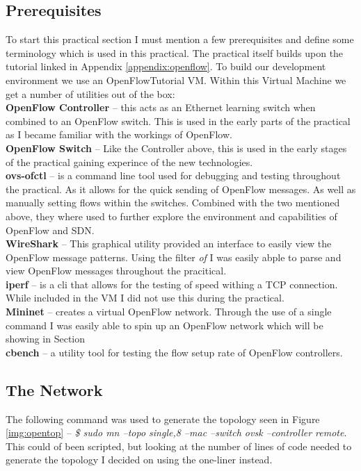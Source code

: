 \subsection{Prerequisites} 
To start this practical section I must mention a few prerequisites and define some terminology which is used in this practical. The practical itself builds upon the tutorial linked in Appendix \ref{appendix:openflow}. To build our development environment we use an OpenFlowTutorial VM. Within this Virtual Machine we get a number of utilities out of the box:
\\\textbf{OpenFlow Controller} -- this acts as an Ethernet learning switch when combined to an OpenFlow switch. This is used in the early parts of the practical as I became familiar with the workings of OpenFlow.
\\\textbf{OpenFlow Switch} -- Like the Controller above, this is used in the early stages of the practical gaining experince of the new technologies.
\\\textbf{ovs-ofctl} -- is a command line tool used for debugging and testing throughout the practical. As it allows for the quick sending of OpenFlow messages. As well as manually setting flows within the switches. Combined with the two mentioned above, they where used to further explore the environment and capabilities of OpenFlow and SDN.
\\\textbf{WireShark} -- This graphical utility provided an interface to easily view the OpenFlow message patterns. Using the filter \textit{of} I was easily abple to parse and view OpenFlow messages throughout the pracitical.
\\\textbf{iperf} -- is a cli that allows for the testing of speed withing a TCP connection. While included in the VM I did not use this during the practical.
\\\textbf{Mininet} -- creates a virtual OpenFlow network. Through the use of a single command I was easily able to spin up an OpenFlow network which will be showing in Section \label{sub:net}
\\\textbf{cbench} -- a utility tool for testing the flow setup rate of OpenFlow controllers.



\clearpage

\subsection{The Network}
\label{sub:net}
The following command was used to generate the topology seen in Figure \ref{img:opentop} -- \textit{\$ sudo mn --topo single,8 --mac --switch ovsk --controller remote}. This could of been scripted, but looking at the number of lines of code needed to generate the topology I decided on using the one-liner instead.

